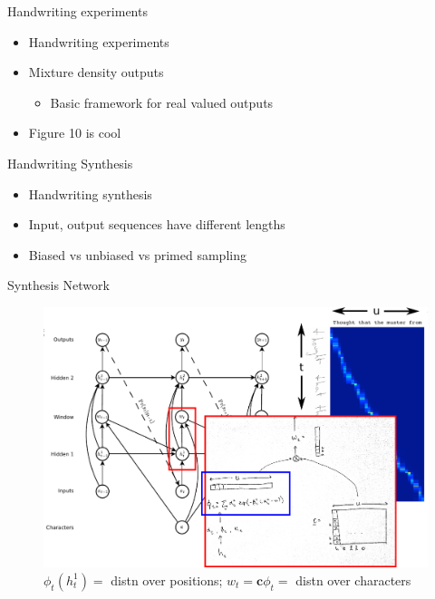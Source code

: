 \documentclass[xcolor=dvipsnames]{beamer}
\begin{document}
\begin{frame}{Handwriting experiments}
  \begin{itemize}
  \item 
 Handwriting experiments 
 \item
 Mixture density outputs
 \begin{itemize}
 \item Basic framework for real valued outputs
 \end{itemize}
\item 
 Figure 10 is cool
  \end{itemize}
\end{frame}

\begin{frame}{Handwriting Synthesis}
 \begin{itemize}
 \item 
 Handwriting synthesis 
 \item Input, output sequences have different lengths
 \item Biased vs unbiased vs primed sampling
 \end{itemize}
\end{frame}

\begin{frame}{Synthesis Network}
  \begin{figure}
    \centering
  \includegraphics[width=.9\linewidth]{fig/synthesis_network3.png}
    \caption{$\phi_t(h_t^1) = $ distn over positions; $w_t = \mathbf{c}
      \phi_t =$ distn over characters}
    \label{fig:synthesis-network}
  \end{figure}
\end{frame}
\end{document}
